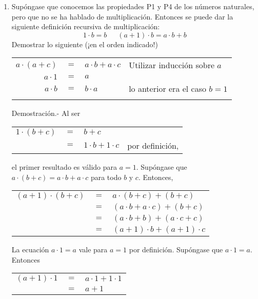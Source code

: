 \begin{enumerate}
       \item Supóngase que conocemos las propiedades P1 y P4 de los números naturales, pero que no se ha hablado de multiplicación. Entonces se puede dar la siguiente definición recursiva de multiplicación: $$1\cdot b=b\,\,\,\,\,\,\,\,\, (a+1)\cdot b =a\cdot b +b$$
          Demostrar lo siguiente (¡en el orden indicado!)
          \begin{center}
             \begin{tabular}{rcll}
                $a\cdot (a+c)$&$=$&$a\cdot b + a\cdot c$&Utilizar inducción sobre $a$\\
                $a \cdot 1$&$=$&$a$&\\
                $a \cdot b$&$=$&$b\cdot a$&lo anterior era el caso $b=1$\\\\
             \end{tabular}
          \end{center}
          Demostración.-\; Al ser 
	  \begin{center}
	      \begin{tabular}{rcll}
		  $1\cdot (b+c)$&$=$&$b+c$&\\
		  &$=$&$1\cdot b + 1 \cdot c$&por definición,\\
	      \end{tabular}
	  \end{center}
	  el primer resultado es válido para $a=1$. Supóngase que $a\cdot(b+c)=a\cdot b + a\cdot c$ para todo $b$ y $c$. Entonces,
	  \begin{center}
	      \begin{tabular}{rcl}
		  $(a+1)\cdot (b+c)$&$=$&$a\cdot (b+c)+(b+c)$\\
		  &$=$&$(a\cdot b + a\cdot c)+(b+c)$\\
		  &$=$&$(a\cdot b + b) + (a\cdot c + c)$\\
		  &$=$&$(a+1)\cdot b + (a+1)\cdot c$\\
	      \end{tabular}
	  \end{center}
	  La ecuación $a\cdot 1 = a$ vale para $a=1$ por definición. Supóngase que $a\cdot 1 = a$. Entonces
	  \begin{center}
	      \begin{tabular}{rcl}
		  $(a+1)\cdot 1$&$=$&$a\cdot 1 + 1 \cdot 1$\\
		  &$=$&$a+1$\\

\end{tabular}
\end{center}
\end{enumerate}
